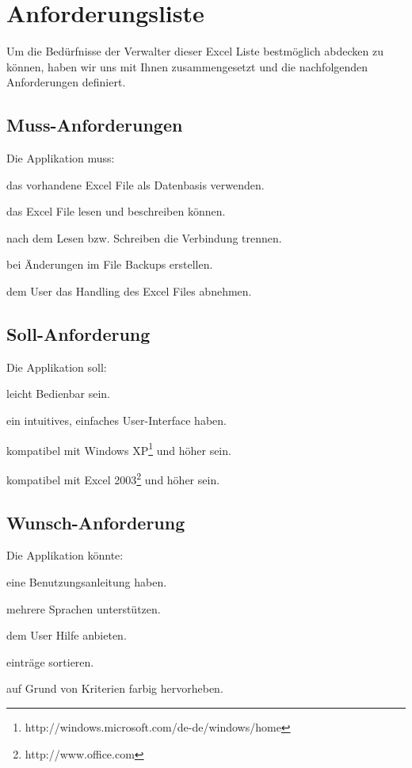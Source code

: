 \documentclass{article}
\begin{document}
\newpage


\section{Anforderungsliste}
Um die Bedürfnisse der Verwalter dieser Excel Liste bestmöglich abdecken zu können, haben wir uns mit Ihnen zusammengesetzt und die nachfolgenden Anforderungen definiert.
	
\subsection{Muss-Anforderungen}
Die Applikation muss:
	\begin{description}[labelindent=1cm]
		\item[M1:] das vorhandene Excel File als Datenbasis verwenden.
		\item[M2:] das Excel File lesen und beschreiben können.
		\item[M3:] nach dem Lesen bzw. Schreiben die Verbindung trennen.
		\item[M4:] bei Änderungen im File Backups erstellen.
		\item[M5:] dem User das Handling des Excel Files abnehmen.
	\end{description}

\subsection{Soll-Anforderung}
Die Applikation soll:
\begin{description}[labelindent=1cm]
	\item[S1:] leicht Bedienbar sein.
	\item[S2:] ein intuitives, einfaches User-Interface haben.
	\item[S3:] kompatibel mit Windows XP\footnote{http://windows.microsoft.com/de-de/windows/home} und höher sein.
	\item[S4:] kompatibel mit Excel 2003\footnote{http://www.office.com} und höher sein.
\end{description}

\subsection{Wunsch-Anforderung}
Die Applikation könnte:
\begin{description}[labelindent=1cm]
	\item[W1:] eine Benutzungsanleitung haben.
	\item[W2:] mehrere Sprachen unterstützen.
	\item[W3:] dem User Hilfe anbieten.
	\item[W4:] einträge sortieren.
	\item[W5:] auf Grund von Kriterien farbig hervorheben.
	\\
\end{description}
\end{document}
